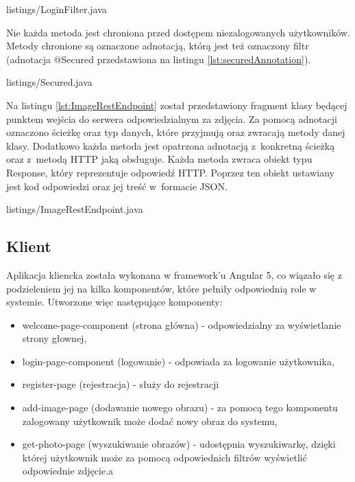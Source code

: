 
{listings/LoginFilter.java}

Nie każda metoda jest chroniona przed dostępem niezalogowanych użytkowników. Metody chronione są oznaczone adnotacją, którą jest też oznaczony filtr (adnotacja @Secured przedstawiona na listingu \ref{lst:securedAnnotation}).


{listings/Secured.java}

Na listingu \ref{lst:ImageRestEndpoint} został przedstawiony fragment klasy będącej punktem wejścia do serwera odpowiedzialnym za zdjęcia. Za pomocą adnotacji oznaczono ścieżkę oraz typ danych, które przyjmują oraz zwracają metody danej klasy. Dodatkowo każda metoda jest opatrzona adnotacją z~konkretną ścieżką oraz z~metodą HTTP jaką obsługuje. Każda metoda zwraca obiekt typu Response, który reprezentuje odpowiedź HTTP. Poprzez ten obiekt ustawiany jest kod odpowiedzi oraz jej treść w~formacie JSON.


{listings/ImageRestEndpoint.java}

\subsection {Klient}
Aplikacja kliencka została wykonana w framework'u Angular 5, co wiązało się z podzieleniem jej na kilka komponentów, które pełniły odpowiednią role w systemie. Utworzone więc następujące komponenty:
\begin{itemize}
	\item welcome-page-component (strona główna) - odpowiedzialny za wyświetlanie strony głownej, 
	\item login-page-component (logowanie) - odpowiada za logowanie użytkownika,
	\item register-page (rejestracja) - służy do rejestracji 
	\item add-image-page (dodawanie nowego obrazu) - za pomocą tego komponentu zalogowany użytkownik może dodać nowy obraz do systemu,
	\item get-photo-page (wyszukiwanie obrazów) - udostępnia wyszukiwarkę, dzięki której użytkownik może za pomocą odpowiednich filtrów wyświetlić odpowiednie zdjęcie.a
	
\end{itemize}

